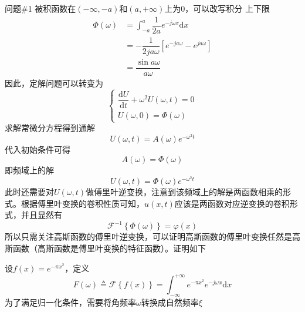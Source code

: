 \documentclass[12pt]{ctexart}
\begin{document}
    \begin{problem}{问题\#1}
        被积函数在$(-\infty,-a)$和$(a,+\infty)$上为0，可以改写积分 上下限
        $$
        \begin{aligned}
            \varPhi(\omega)&=\int^{a}_{-a}\dfrac{1}{2a}e^{-j\omega x}\text{d}x\\
            &=-\dfrac{1}{2ja\omega}\left[e^{-ja\omega}-e^{ja\omega}\right]\\
            &=\dfrac{\sin a\omega}{a\omega}
        \end{aligned}
        $$
        因此，定解问题可以转变为
        $$
        \begin{cases}
            \dfrac{\text{d}U}{\text{d}t}+\omega^2U(\omega,t)=0\\
            U(\omega,0)=\varPhi(\omega)
        \end{cases}
        $$
        求解常微分方程得到通解$$
        U(\omega,t)=A(\omega)e^{-\omega^2t}$$
        代入初始条件可得
        $$A(\omega)=\varPhi(\omega)$$
        即频域上的解
        $$U(\omega,t)=\varPhi(\omega)e^{-\omega^2t}$$
        此时还需要对$U(\omega,t)$做傅里叶逆变换，注意到该频域上的解是两函数相乘的形式。根据傅里叶变换的卷积性质可知，$u(x,t)$应该是两函数对应逆变换的卷积形式，并且显然有
        $$\mathscr{F}^{-1}\left\{\varPhi(\omega)\right\}=\varphi(x)$$
        所以只需关注高斯函数的傅里叶逆变换，可以证明高斯函数的傅里叶变换任然是高斯函数（高斯函数是傅里叶变换的特征函数）。证明如下
        \begin{formal}
            设$f(x)=e^{-\pi x^2}$，定义
            $$
            F(\omega)\triangleq\mathscr{F}\left\{f(x)\right\}=\int^{+\infty}_{-\infty}e^{-\pi x^2}e^{-j\omega x}\text{d}x
            $$
            为了满足归一化条件，需要将角频率$\omega$转换成自然频率$\xi$
        \end{formal}
    \end{problem}
\end{document}
